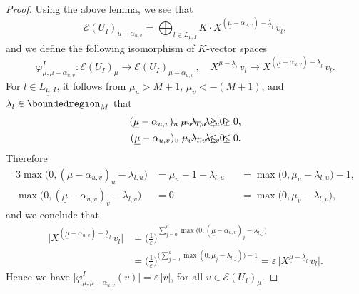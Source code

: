 \documentclass[a4paper, reqno, 10pt]{amsart}
\theoremstyle{definition}
\numberwithin{equation}{section}
\newcommand{\abs}[1]{{\lvert{#1}\rvert}}
\newcommand{\lra}{\longrightarrow}
\newcommand{\lto}{\longmapsto}
\newcommand{\ul}[1]{{\underline{#1}}}
\newcommand{\CE}{{\mathcal {E}}}
\begin{document}
\begin{proof}
	
	Using the above lemma, we see that
	\begin{equation*}
		\CE(U_I)_{\ul{\mu} -\alpha_{u,v}} = \bigoplus_{l\in L_{\ul{\mu},I}} K \cdot X^{(\ul{\mu} -\alpha_{u,v}) - \ul{\lambda}_l} \, v_l,
	\end{equation*}
	and we define the following isomorphism of $K$-vector spaces
	\begin{equation*}
		\varphi^I_{\ul{\mu},\ul{\mu}-\alpha_{u,v}} \colon \CE(U_I)_{\ul{\mu}} \lra \CE(U_I)_{\ul{\mu}-\alpha_{u,v}} \,,\quad X^{\ul{\mu} - \ul{\lambda}_l} \, v_l \lto X^{(\ul{\mu} -\alpha_{u,v}) - \ul{\lambda}_l} \, v_l .
	\end{equation*}
	For $l\in L_{\ul{\mu},I}$, it follows from $\mu_u > M+1$, $\mu_v < - (M+1)$, and $\ul{\lambda}_l\in \boundedregion_M$ that
	\begin{align*}
		(\ul{\mu}-\alpha_{u,v})_u - \lambda_{l,u} &\geq 0 , \hspace{-2cm} & \mu_u - \lambda_{l,u}  &\geq 0 , \\
		(\ul{\mu}-\alpha_{u,v})_v - \lambda_{l,v} &\leq 0 , \hspace{-2cm}& \mu_v - \lambda_{l,v}  &\leq 0 .
	\end{align*}
	Therefore
	\begin{alignat*}{3}
		\max\big(0,(\ul{\mu}-\alpha_{u,v})_u - \lambda_{l,u} \big) &= \mu_u -1 - \lambda_{l,u} &&= \max\big(0, \mu_u - \lambda_{l,u}\big) -1, \\
		\max\big(0,(\ul{\mu}-\alpha_{u,v})_v - \lambda_{l,v} \big) &= 0 &&= \max\big(0, \mu_v - \lambda_{l,v}\big) ,
	\end{alignat*}
	and we conclude that
	\begin{align*}
		\big\lvert X^{(\ul{\mu} -\alpha_{u,v}) - \ul{\lambda}_l} \, v_l \big\rvert
		&= \bigg(\frac{1}{\varepsilon}\bigg)^{\sum_{j=0}^d \max\big(0,(\ul{\mu}-\alpha_{u,v})_j - \lambda_{l,j}\big) } \\
		&= \bigg(\frac{1}{\varepsilon}\bigg)^{\big(\sum_{j=0}^d \max(0,\mu_j - \lambda_{l,j}) \big) -1 } 
		= \varepsilon \, \big\lvert X^{\ul{\mu}  - \ul{\lambda}_l} \, v_l \big\rvert .
	\end{align*}
	Hence we have $\abs{\varphi^I_{\ul{\mu},\ul{\mu}-\alpha_{u,v}}(v)} =\varepsilon \,\abs{v}$, for all $v\in \CE(U_{I})_\ul{\mu}$.
	

\end{proof}
\end{document}
